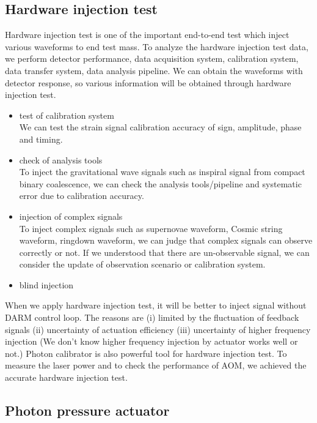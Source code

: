 \subsection{Hardware injection test}
Hardware injection test is one of the important end-to-end test which 
inject various waveforms to end test mass.
To analyze the hardware injection test data, we perform 
detector performance, data acquisition system, calibration system, 
data transfer system, data analysis pipeline.
We can obtain the waveforms with detector response, so 
various information will be obtained through hardware injection test.
\begin{itemize}
\item test of calibration system\\
We can test the strain signal calibration accuracy of 
sign, amplitude, phase and timing.
\item check of analysis tools\\
To inject the gravitational wave signals such as inspiral signal from 
compact binary coalescence, we can check the analysis tools/pipeline 
and systematic error due to calibration accuracy.
\item injection of complex signals\\
To inject complex signals such as supernovae waveform, Cosmic string waveform, ringdown waveform, 
we can judge that complex signals can observe correctly or not. 
If we understood that there are un-observable signal, we can consider the update of observation scenario or
calibration system.
\item blind injection\\
\end{itemize}
When we apply hardware injection test, it will be better to inject signal without DARM control loop.
The reasons are (i) limited by the fluctuation of feedback signals (ii) uncertainty of actuation efficiency
(iii) uncertainty of higher frequency injection 
(We don't know higher frequency injection by actuator works well or not.)
Photon calibrator is also powerful tool for hardware injection test.
To measure the laser power and to check the performance of AOM, we achieved the accurate hardware injection test.

\subsection{Photon pressure actuator}



